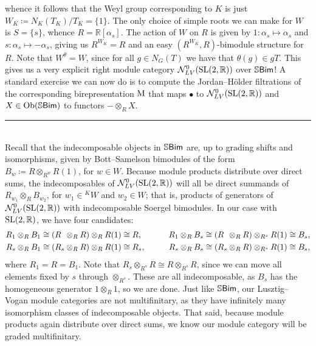 \begin{example}
whence it follows that the Weyl group corresponding to $K$ is just $W_K \coloneqq N_K(T_K)/T_K = \{1\}$. The only choice of simple roots we can make for $W$ is $S = \{s\}$, whence $R = \mathbb{R}[\alpha_{s}]$. The action of $W$ on $R$ is given by $1 : \alpha_s \mapsto \alpha_s$ and $s : \alpha_s \mapsto -\alpha_s$, giving us $R^{W_K} = R$ and an easy $(R^{W_K}, R)$-bimodule structure for $R$. Note that $W^\theta = W$, since for all $g \in N_G(T)$ we have that $\theta(g) \in gT$. This gives us a very explicit right module category $\mathcal{N}_{LV}^0(\textup{SL}(2, \mathbb{R}))$ over $\mathbb{S}\textup{\textsf{Bim}}$! A standard exercise we can now do is to compute the Jordan--H\"{o}lder filtrations of the corresponding birepresentation $\textup{M}$ that maps $\bullet$ to $\mathcal{N}_{LV}^0(\textup{SL}(2, \mathbb{R}))$ and $X \in \textup{Ob}(\mathbb{S}\textup{\textsf{Bim}})$ to functors $- \otimes_R X$.\\[-1.5\baselineskip]%
\begin{center}
\rule{0.5\linewidth}{1pt}
\end{center}
\noindent\\[-\baselineskip]
\noindent Recall that the indecomposable objects in $\mathbb{S}\textup{\textsf{Bim}}$ are, up to grading shifts and isomorphisms, given by Bott--Samelson bimodules of the form $B_w \coloneqq R \otimes_{R^w} R(1)$, for $w \in W$. Because module products distribute over direct sums, the indecomposables of $\mathcal{N}_{LV}^0(\textup{SL}(2, \mathbb{R}))$ will all be direct summands of $R_{w_1} \otimes_R B_{w_2}$, for $w_1 \in {}^KW$ and $w_2 \in W$; that is, products of generators of $\mathcal{N}_{LV}^0(\textup{SL}(2, \mathbb{R}))$ with indecomposable Soergel bimodules. In our case with $\textup{SL}(2, \mathbb{R})$, we have four candidates:
\begin{alignat*}{2}
R_1 \otimes_R B_1 \cong (R\hphantom{{}_{s}} \otimes_R R) \otimes_R R(1) &\cong R,&\qquad R_1 \otimes_R B_{s} \cong (R\hphantom{{}_{s}} \otimes_R R) \otimes_{R^{s}} R(1) &\cong B_{s},\\
R_{s} \otimes_R B_1 \cong (R_{s} \otimes_R R) \otimes_R R(1) &\cong R_{s},&\qquad R_{s} \otimes_R B_{s} \cong (R_{s} \otimes_R R) \otimes_{R^{s}} R(1) &\cong B_{s},
\end{alignat*}
\noindent where $R_1 = R = B_1$. Note that $R_s \otimes_{R^s} R \cong R \otimes_{R^s} R$, since we can move all elements fixed by $s$ through $\otimes_{R^s}$. These are all indecomposable, as $B_s$ has the homogeneous generator $1 \otimes_R 1$, so we are done. Just like $\mathbb{S}\textup{\textsf{Bim}}$, our Lusztig--Vogan module categories are not multifinitary, as they have infinitely many isomorphism classes of indecomposable objects. That said, because module products again distribute over direct sums, we know our module category will be graded multifinitary.\newpage %


\end{example}
